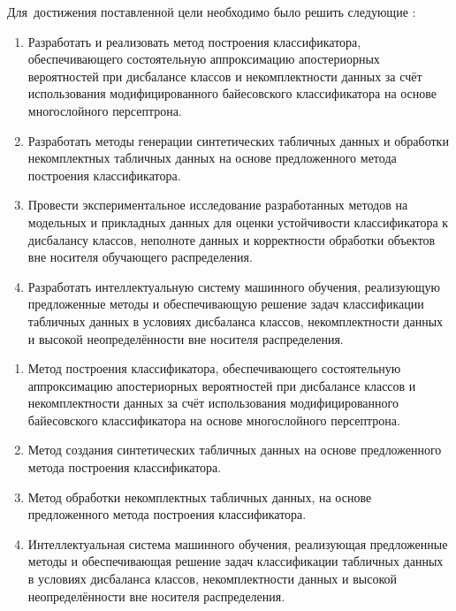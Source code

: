 Для~достижения поставленной цели необходимо было решить следующие {\tasks}:
\begin{enumerate}[beginpenalty=10000] %
  \item Разработать и реализовать метод построения классификатора, обеспечивающего состоятельную аппроксимацию апостериорных вероятностей при дисбалансе классов и некомплектности данных за счёт использования модифицированного байесовского классификатора на основе многослойного персептрона.

  \item Разработать методы генерации синтетических табличных данных и обработки некомплектных табличных данных на основе предложенного метода построения классификатора.

  \item Провести экспериментальное исследование разработанных методов на модельных и прикладных данных для оценки устойчивости классификатора к дисбалансу классов, неполноте данных и корректности обработки объектов вне носителя обучающего распределения.

  \item Разработать интеллектуальную систему машинного обучения, реализующую предложенные методы и обеспечивающую решение задач классификации табличных данных в условиях дисбаланса классов, некомплектности данных и высокой неопределённости вне носителя распределения.
\end{enumerate}

{}
\begin{enumerate}[beginpenalty=10000] %
  \item Метод построения классификатора, обеспечивающего состоятельную аппроксимацию апостериорных вероятностей при дисбалансе классов и некомплектности данных за счёт использования модифицированного байесовского классификатора на основе многослойного персептрона.
  
  \item Метод создания синтетических табличных данных на основе предложенного метода построения классификатора.

  \item Метод обработки некомплектных табличных данных, на основе предложенного метода построения классификатора.

  \item Интеллектуальная система машинного обучения, реализующая предложенные методы и обеспечивающая решение задач классификации табличных данных в условиях дисбаланса классов, некомплектности данных и высокой неопределённости вне носителя распределения.
\end{enumerate}

